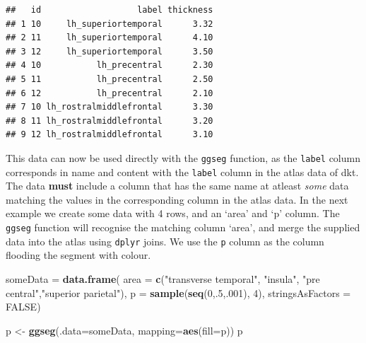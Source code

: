 \documentclass[fleqn,10pt]{wlpeerj} %
\newenvironment{Shaded}{\begin{snugshade}}{\end{snugshade}}
\newcommand{\DataTypeTok}[1]{\textcolor[rgb]{0.13,0.29,0.53}{#1}}
\newcommand{\DecValTok}[1]{\textcolor[rgb]{0.00,0.00,0.81}{#1}}
\newcommand{\KeywordTok}[1]{\textcolor[rgb]{0.13,0.29,0.53}{\textbf{#1}}}
\newcommand{\NormalTok}[1]{#1}
\newcommand{\OperatorTok}[1]{\textcolor[rgb]{0.81,0.36,0.00}{\textbf{#1}}}
\newcommand{\OtherTok}[1]{\textcolor[rgb]{0.56,0.35,0.01}{#1}}
\newcommand{\StringTok}[1]{\textcolor[rgb]{0.31,0.60,0.02}{#1}}
\begin{document}
\begin{Shaded}
\end{Shaded}

\begin{verbatim}
##   id                   label thickness
## 1 10     lh_superiortemporal      3.32
## 2 11     lh_superiortemporal      4.10
## 3 12     lh_superiortemporal      3.50
## 4 10           lh_precentral      2.30
## 5 11           lh_precentral      2.50
## 6 12           lh_precentral      2.10
## 7 10 lh_rostralmiddlefrontal      3.30
## 8 11 lh_rostralmiddlefrontal      3.20
## 9 12 lh_rostralmiddlefrontal      3.10
\end{verbatim}

This data can now be used directly with the \texttt{ggseg} function, as the \texttt{label} column corresponds in name and content with the \texttt{label} column in the atlas data of dkt.
The data \textbf{must} include a column that has the same name at atleast \emph{some} data matching the values in the corresponding column in the atlas data.
In the next example we create some data with 4 rows, and an `area' and `p' column.
The \texttt{ggseg} function will recognise the matching column `area', and merge the supplied data into the atlas using \texttt{dplyr} joins.
We use the \texttt{p} column as the column flooding the segment with colour.

\begin{Shaded}
\begin{Highlighting}[]
\NormalTok{someData =}\StringTok{ }\KeywordTok{data.frame}\NormalTok{(}
  \DataTypeTok{area =} \KeywordTok{c}\NormalTok{(}\StringTok{"transverse temporal"}\NormalTok{, }\StringTok{"insula"}\NormalTok{,}
           \StringTok{"pre central"}\NormalTok{,}\StringTok{"superior parietal"}\NormalTok{), }
  \DataTypeTok{p =} \KeywordTok{sample}\NormalTok{(}\KeywordTok{seq}\NormalTok{(}\DecValTok{0}\NormalTok{,.}\DecValTok{5}\NormalTok{,.}\DecValTok{001}\NormalTok{), }\DecValTok{4}\NormalTok{),}
  \DataTypeTok{stringsAsFactors =} \OtherTok{FALSE}\NormalTok{)}

\NormalTok{p <-}\StringTok{ }\KeywordTok{ggseg}\NormalTok{(}\DataTypeTok{.data=}\NormalTok{someData, }\DataTypeTok{mapping=}\KeywordTok{aes}\NormalTok{(}\DataTypeTok{fill=}\NormalTok{p))}
\NormalTok{p}
\end{Highlighting}
\end{Shaded}
\end{document}
